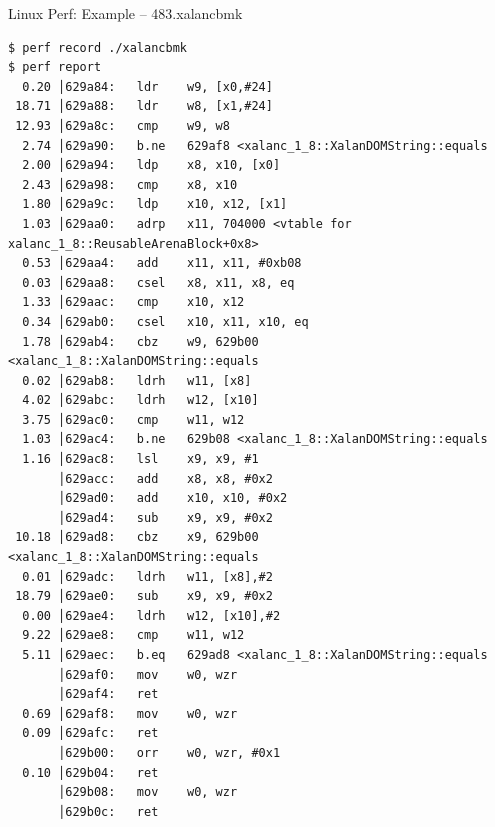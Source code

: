 \documentclass{beamer}
\begin{document}
\begin{frame}[fragile]{Linux Perf: Example -- 483.xalancbmk}
  \begin{lrbox}{\myv}
    \begin{minipage}{\textwidth}
\begin{verbatim}
$ perf record ./xalancbmk
$ perf report
  0.20 │629a84:   ldr    w9, [x0,#24]
 18.71 │629a88:   ldr    w8, [x1,#24]
 12.93 │629a8c:   cmp    w9, w8
  2.74 │629a90:   b.ne   629af8 <xalanc_1_8::XalanDOMString::equals
  2.00 │629a94:   ldp    x8, x10, [x0]
  2.43 │629a98:   cmp    x8, x10
  1.80 │629a9c:   ldp    x10, x12, [x1]
  1.03 │629aa0:   adrp   x11, 704000 <vtable for xalanc_1_8::ReusableArenaBlock+0x8>
  0.53 │629aa4:   add    x11, x11, #0xb08
  0.03 │629aa8:   csel   x8, x11, x8, eq
  1.33 │629aac:   cmp    x10, x12
  0.34 │629ab0:   csel   x10, x11, x10, eq
  1.78 │629ab4:   cbz    w9, 629b00 <xalanc_1_8::XalanDOMString::equals
  0.02 │629ab8:   ldrh   w11, [x8]
  4.02 │629abc:   ldrh   w12, [x10]
  3.75 │629ac0:   cmp    w11, w12
  1.03 │629ac4:   b.ne   629b08 <xalanc_1_8::XalanDOMString::equals
  1.16 │629ac8:   lsl    x9, x9, #1
       │629acc:   add    x8, x8, #0x2
       │629ad0:   add    x10, x10, #0x2
       │629ad4:   sub    x9, x9, #0x2
 10.18 │629ad8:   cbz    x9, 629b00 <xalanc_1_8::XalanDOMString::equals
  0.01 │629adc:   ldrh   w11, [x8],#2
 18.79 │629ae0:   sub    x9, x9, #0x2
  0.00 │629ae4:   ldrh   w12, [x10],#2
  9.22 │629ae8:   cmp    w11, w12
  5.11 │629aec:   b.eq   629ad8 <xalanc_1_8::XalanDOMString::equals
       │629af0:   mov    w0, wzr
       │629af4:   ret
  0.69 │629af8:   mov    w0, wzr
  0.09 │629afc:   ret
       │629b00:   orr    w0, wzr, #0x1
  0.10 │629b04:   ret
       │629b08:   mov    w0, wzr
       │629b0c:   ret
\end{verbatim}
    \end{minipage}
  \end{lrbox}
  \resizebox{0.5\textwidth}{!}{\usebox\myv}
\end{frame}

\end{document}
